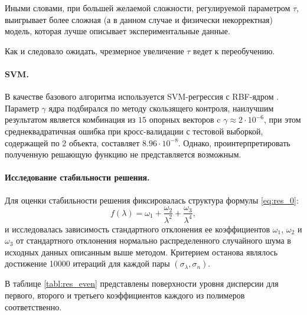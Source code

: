 \documentclass[11pt,a4paper]{article}
\theoremstyle{definition}
\begin{document}
Иными словами, при большей желаемой сложности,
регулируемой параметром $\tau$, выигрывает более сложная (а в данном случае и
физически некорректная) модель, которая лучше описывает экспериментальные данные.

Как и следовало ожидать, чрезмерное увеличение $\tau$ ведет к переобучению.

\paragraph{SVM.}

В качестве базового алгоритма используется SVM-регрессия с RBF-ядром \cite{Vapnik79}.
Параметр $\gamma$ ядра подбирался по методу скользящего контроля, наилучшим результатом является
комбинация из $15$ опорных векторов c $\gamma \approx 2 \cdot 10^{-6}$, при этом
среднеквадратичная ошибка при кросс-валидации с тестовой выборкой, содержащей по 2
объекта, составляет $8.96 \cdot 10^{-8}$. Однако, проинтерпретировать полученную
решающую функцию не представляется возможным.

\paragraph{Исследование стабильности решения.}

Для оценки стабильности решения фиксировалась структура формулы \eqref{eq:res_0}:
\[
  f(\lambda) = \omega_1 + \frac{\omega_2}{\lambda^2} + \frac{\omega_3}{\lambda^4},
\]
и исследовалась зависимость стандартного отклонения ее коэффициентов $\omega_1$,
$\omega_2$ и $\omega_3$ от стандартного отклонения
нормально распределенного случайного шума в исходных данных описанным выше методом.
Критерием останова являлось достижение 10000 итераций для каждой пары
$(\sigma_{\lambda}, \sigma_n)$.

В таблице \ref{tabl:res_even} представлены
поверхности уровня дисперсии для первого, второго и третьего коэффициентов каждого из полимеров
соответственно.
\end{document}
